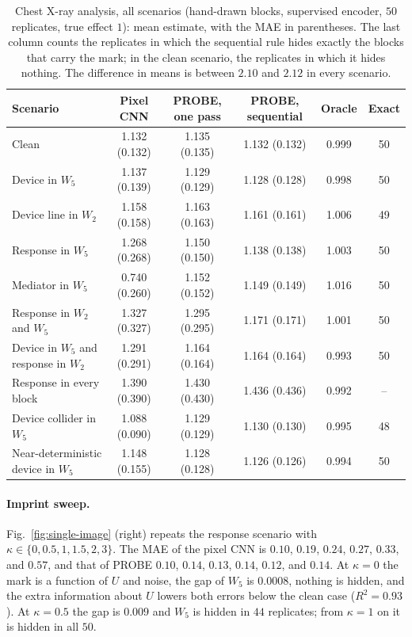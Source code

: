 \begin{table}[t]
\caption{Chest X-ray analysis, all scenarios (hand-drawn blocks, supervised encoder, $50$ replicates, true effect $1$): mean estimate, with the MAE in parentheses. The last column counts the replicates in which the sequential rule hides exactly the blocks that carry the mark; in the clean scenario, the replicates in which it hides nothing. The difference in means is between $2.10$ and $2.12$ in every scenario.}
\label{tab:single-image-appendix}
\centering
\footnotesize
\begin{tabular}{lccccc}
\toprule
Scenario & Pixel CNN & PROBE, one pass & PROBE, sequential & Oracle & Exact \\
\midrule
Clean & 1.132 (0.132) & 1.135 (0.135) & 1.132 (0.132) & 0.999 & 50 \\
Device in $W_5$ & 1.137 (0.139) & 1.129 (0.129) & 1.128 (0.128) & 0.998 & 50 \\
Device line in $W_2$ & 1.158 (0.158) & 1.163 (0.163) & 1.161 (0.161) & 1.006 & 49 \\
Response in $W_5$ & 1.268 (0.268) & 1.150 (0.150) & 1.138 (0.138) & 1.003 & 50 \\
Mediator in $W_5$ & 0.740 (0.260) & 1.152 (0.152) & 1.149 (0.149) & 1.016 & 50 \\
Response in $W_2$ and $W_5$ & 1.327 (0.327) & 1.295 (0.295) & 1.171 (0.171) & 1.001 & 50 \\
Device in $W_5$ and response in $W_2$ & 1.291 (0.291) & 1.164 (0.164) & 1.164 (0.164) & 0.993 & 50 \\
Response in every block & 1.390 (0.390) & 1.430 (0.430) & 1.436 (0.436) & 0.992 & -- \\
Device collider in $W_5$ & 1.088 (0.090) & 1.129 (0.129) & 1.130 (0.130) & 0.995 & 48 \\
Near-deterministic device in $W_5$ & 1.148 (0.155) & 1.128 (0.128) & 1.126 (0.126) & 0.994 & 50 \\
\bottomrule
\end{tabular}
\end{table}

\paragraph{Imprint sweep.} Fig.~\ref{fig:single-image} (right) repeats the response scenario with $\kappa\in\{0,0.5,1,1.5,2,3\}$. The MAE of the pixel CNN is $0.10$, $0.19$, $0.24$, $0.27$, $0.33$, and $0.57$, and that of PROBE $0.10$, $0.14$, $0.13$, $0.14$, $0.12$, and $0.14$. At $\kappa=0$ the mark is a function of $U$ and noise, the gap of $W_5$ is $0.0008$, nothing is hidden, and the extra information about $U$ lowers both errors below the clean case ($R^2=0.93$). At $\kappa=0.5$ the gap is $0.009$ and $W_5$ is hidden in $44$ replicates; from $\kappa=1$ on it is hidden in all $50$.

